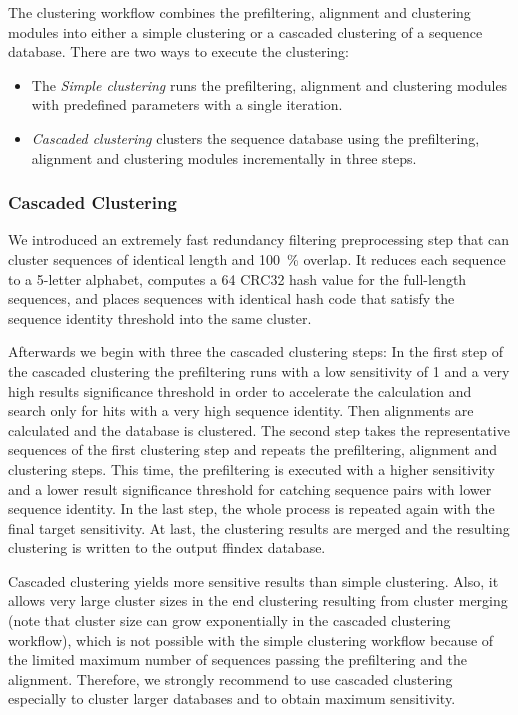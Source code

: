 \documentclass[11pt,a4paper]{scrreprt}
\begin{document}
The clustering workflow combines the prefiltering, alignment and clustering modules into either a simple clustering or a cascaded clustering of a sequence database. There are two ways to execute the clustering:

\begin{itemize}
\item The \emph{Simple clustering} runs the prefiltering, alignment and clustering
modules with predefined parameters with a single iteration.
\item \emph{Cascaded clustering} clusters the sequence database using the prefiltering, alignment and clustering modules incrementally in three steps.
\end{itemize}
\subsubsection{Cascaded Clustering}
We introduced an extremely fast redundancy filtering preprocessing step that can cluster sequences of identical length and \SI{100}{\percent} overlap. It reduces each sequence to a \num{5}-letter alphabet, computes a \SI{64}{\bit} CRC32 hash value for the full-length sequences, and places sequences with identical hash code that satisfy the sequence identity threshold into the same cluster.

Afterwards we begin with three the cascaded clustering steps: In the first step of the cascaded clustering the prefiltering runs with a low sensitivity of 1 and a very high results significance threshold in order to accelerate the calculation and search only for hits with a very high sequence identity. Then alignments are calculated and the database is clustered. The second step takes the representative sequences of the first clustering step and repeats the prefiltering, alignment and clustering steps. This time, the prefiltering is executed with a higher sensitivity and a lower result significance threshold for catching sequence pairs with lower sequence identity. In the last step, the whole process is repeated again with the final target sensitivity. At last, the clustering results are merged and the resulting clustering is written to the output ffindex database. 

Cascaded clustering yields more sensitive results than simple clustering. Also, it allows very large cluster sizes in the end clustering resulting from cluster merging (note that cluster size can grow exponentially in the cascaded clustering workflow), which is not possible with the simple clustering workflow because of the limited maximum number of sequences passing the prefiltering and the alignment. Therefore, we strongly recommend to use cascaded clustering especially to cluster larger databases and to obtain maximum sensitivity.
\end{document}
